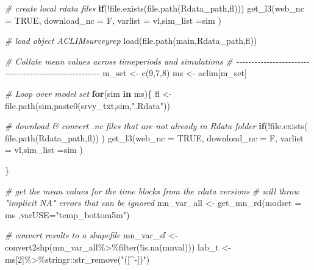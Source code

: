 \documentclass[
]{article}
\newenvironment{Shaded}{\begin{snugshade}}{\end{snugshade}}
\newcommand{\AttributeTok}[1]{\textcolor[rgb]{0.77,0.63,0.00}{#1}}
\newcommand{\CommentTok}[1]{\textcolor[rgb]{0.56,0.35,0.01}{\textit{#1}}}
\newcommand{\ConstantTok}[1]{\textcolor[rgb]{0.00,0.00,0.00}{#1}}
\newcommand{\ControlFlowTok}[1]{\textcolor[rgb]{0.13,0.29,0.53}{\textbf{#1}}}
\newcommand{\DecValTok}[1]{\textcolor[rgb]{0.00,0.00,0.81}{#1}}
\newcommand{\FunctionTok}[1]{\textcolor[rgb]{0.00,0.00,0.00}{#1}}
\newcommand{\NormalTok}[1]{#1}
\newcommand{\OtherTok}[1]{\textcolor[rgb]{0.56,0.35,0.01}{#1}}
\newcommand{\SpecialCharTok}[1]{\textcolor[rgb]{0.00,0.00,0.00}{#1}}
\newcommand{\StringTok}[1]{\textcolor[rgb]{0.31,0.60,0.02}{#1}}
\begin{document}
\begin{Shaded}
\begin{Highlighting}[]
    \CommentTok{\# create local rdata files }
    \ControlFlowTok{if}\NormalTok{(}\SpecialCharTok{!}\FunctionTok{file.exists}\NormalTok{(}\FunctionTok{file.path}\NormalTok{(Rdata\_path,fl)))}
      \FunctionTok{get\_l3}\NormalTok{(}\AttributeTok{web\_nc =} \ConstantTok{TRUE}\NormalTok{, }\AttributeTok{download\_nc =}\NormalTok{ F,}
          \AttributeTok{varlist =}\NormalTok{ vl,}\AttributeTok{sim\_list =}\NormalTok{sim )}
    
    \CommentTok{\# load object \textquotesingle{}ACLIMsurveyrep\textquotesingle{}}
    \FunctionTok{load}\NormalTok{(}\FunctionTok{file.path}\NormalTok{(main,Rdata\_path,fl))   }
     
    
    \CommentTok{\# Collate mean values across timeperiods and simulations}
    \CommentTok{\# {-}{-}{-}{-}{-}{-}{-}{-}{-}{-}{-}{-}{-}{-}{-}{-}{-}{-}{-}{-}{-}{-}{-}{-}{-}{-}{-}{-}{-}{-}{-}{-}{-}{-}{-}{-}{-}{-}{-}{-}{-}{-}{-}{-}{-}{-}{-}{-}{-}{-}{-}{-}{-}{-}{-}}
\NormalTok{    m\_set      }\OtherTok{\textless{}{-}} \FunctionTok{c}\NormalTok{(}\DecValTok{9}\NormalTok{,}\DecValTok{7}\NormalTok{,}\DecValTok{8}\NormalTok{)}
\NormalTok{    ms         }\OtherTok{\textless{}{-}}\NormalTok{ aclim[m\_set]}
    
    \CommentTok{\# Loop over model set}
    \ControlFlowTok{for}\NormalTok{(sim }\ControlFlowTok{in}\NormalTok{ ms)\{}
\NormalTok{     fl         }\OtherTok{\textless{}{-}} \FunctionTok{file.path}\NormalTok{(sim,}\FunctionTok{paste0}\NormalTok{(srvy\_txt,sim,}\StringTok{".Rdata"}\NormalTok{))}
    
      \CommentTok{\# download \& convert .nc files that are not already in Rdata folder}
      \ControlFlowTok{if}\NormalTok{(}\SpecialCharTok{!}\FunctionTok{file.exists}\NormalTok{( }\FunctionTok{file.path}\NormalTok{(Rdata\_path,fl)) )}
        \FunctionTok{get\_l3}\NormalTok{(}\AttributeTok{web\_nc =} \ConstantTok{TRUE}\NormalTok{, }\AttributeTok{download\_nc =}\NormalTok{ F,}
            \AttributeTok{varlist =}\NormalTok{ vl,}\AttributeTok{sim\_list =}\NormalTok{sim )}
       
      
\NormalTok{    \}}
      
    \CommentTok{\# get the mean values for the time blocks from the rdata versions}
    \CommentTok{\# will throw "implicit NA" errors that can be ignored}
\NormalTok{    mn\_var\_all }\OtherTok{\textless{}{-}} \FunctionTok{get\_mn\_rd}\NormalTok{(}\AttributeTok{modset =}\NormalTok{ ms ,}\AttributeTok{varUSE=}\StringTok{"temp\_bottom5m"}\NormalTok{)}
    
    \CommentTok{\# convert results to a shapefile}
\NormalTok{    mn\_var\_sf  }\OtherTok{\textless{}{-}} \FunctionTok{convert2shp}\NormalTok{(mn\_var\_all}\SpecialCharTok{\%\textgreater{}\%}\FunctionTok{filter}\NormalTok{(}\SpecialCharTok{!}\FunctionTok{is.na}\NormalTok{(mnval)))}
\NormalTok{    lab\_t      }\OtherTok{\textless{}{-}}\NormalTok{ ms[}\DecValTok{2}\NormalTok{]}\SpecialCharTok{\%\textgreater{}\%}\NormalTok{stringr}\SpecialCharTok{::}\FunctionTok{str\_remove}\NormalTok{(}\StringTok{"([\^{}{-}])"}\NormalTok{)}
    

\end{Highlighting}
\end{Shaded}
\end{document}
